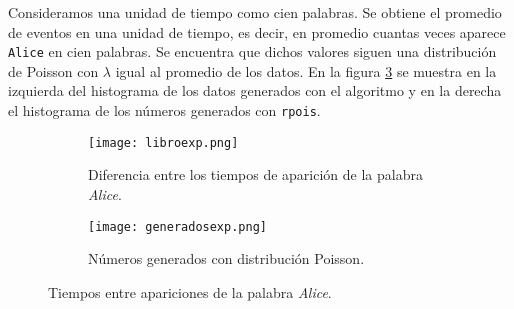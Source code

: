 \documentclass[12pt,letterpaper]{article}
\begin{document}
Consideramos una unidad de tiempo como cien palabras. Se obtiene el promedio de eventos en una unidad de tiempo, es decir, en promedio cuantas veces aparece \texttt{Alice} en cien palabras. Se encuentra que dichos valores siguen una distribución de Poisson con $\lambda$ igual al promedio de los datos. En la figura \ref{libro} se muestra en la izquierda del histograma de los datos generados con el algoritmo y en la derecha el histograma de los números generados con \texttt{rpois}.

\begin{figure}
\centering	
	\begin{subfigure}[b]{0.45\linewidth}
 		\texttt{[image: libroexp.png]}
 		\caption{Diferencia entre los tiempos de aparición de la palabra \textit{Alice}.}
 		\label{alice}
	\end{subfigure}
	\begin{subfigure}[b]{0.45\linewidth}
 		\texttt{[image: generadosexp.png]}
 		\caption{Números generados con distribución Poisson.}
 	\label{generadoslibro}
	\end{subfigure}
	\caption{Tiempos entre apariciones de la palabra \textit{Alice}.}
		\label{libro}
	\end{figure}
 

\end{document}
